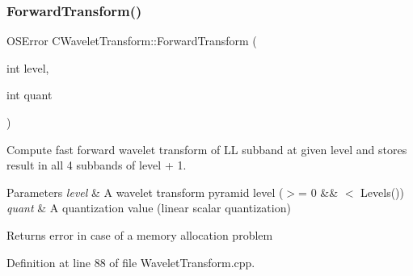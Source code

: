 \subsubsection{\texorpdfstring{ForwardTransform()}{ForwardTransform()}}
{\footnotesize\ttfamily O\+S\+Error C\+Wavelet\+Transform\+::\+Forward\+Transform (\begin{DoxyParamCaption}\item[{int}]{level,  }\item[{int}]{quant }\end{DoxyParamCaption})}

Compute fast forward wavelet transform of LL subband at given level and stores result in all 4 subbands of level + 1. 
\begin{DoxyParams}{Parameters}
{\em level} & A wavelet transform pyramid level ($>$= 0 \&\& $<$ Levels()) \\
\hline
{\em quant} & A quantization value (linear scalar quantization) \\
\hline
\end{DoxyParams}
\begin{DoxyReturn}{Returns}
error in case of a memory allocation problem 
\end{DoxyReturn}


Definition at line 88 of file Wavelet\+Transform.\+cpp.


